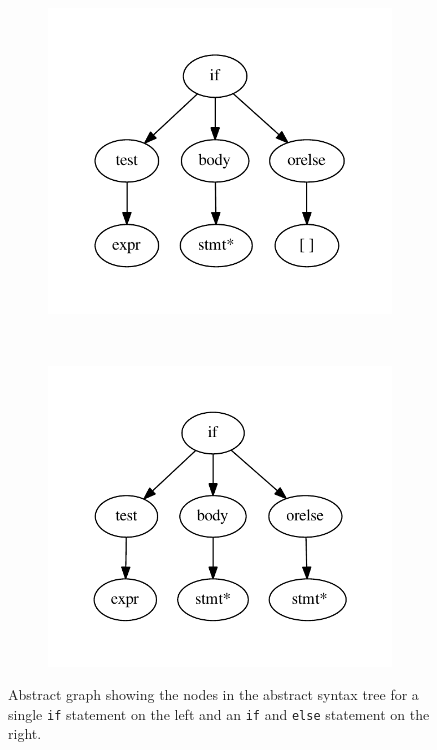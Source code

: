 \begin{figure}
    \begin{subfigure}[b]{0.45\textwidth}
        \includegraphics[width=\textwidth]{./figures/dot_files/if_ast.pdf}
    \end{subfigure}
    ~ %
    \begin{subfigure}[b]{0.45\textwidth}
        \includegraphics[width=\textwidth]{./figures/dot_files/if_else.pdf}
    \end{subfigure}
    \caption{Abstract graph showing the nodes in the abstract syntax tree for a single \texttt{if} statement on the left and an \texttt{if} and \texttt{else} statement on the right.}
    \label{test:ast:if_and_else}
\end{figure}

